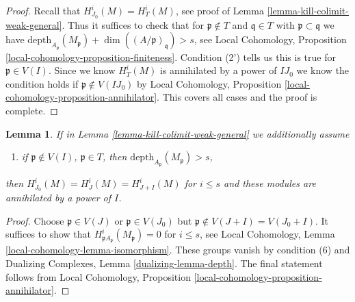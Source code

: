 \documentclass[10pt,a4paper]{amsart}
\theoremstyle{plain}
\newtheorem{lemma}[subsection]{Lemma}
\theoremstyle{definition}
\theoremstyle{remark}
\numberwithin{equation}{subsection}
\begin{document}
\begin{proof}
Recall that $H^i_{J_0}(M) = H^i_T(M)$, see proof of
Lemma \ref{lemma-kill-colimit-weak-general}. Thus it suffices to
check that for $\mathfrak p \not \in T$ and $\mathfrak q \in T$
with $\mathfrak p \subset \mathfrak q$ we have
$\text{depth}_{A_\mathfrak p}(M_\mathfrak p) +
\dim((A/\mathfrak p)_\mathfrak q) > s$, see Local Cohomology,
Proposition \ref{local-cohomology-proposition-finiteness}.
Condition (2') tells us this is true for $\mathfrak p \in V(I)$.
Since we know $H^i_T(M)$ is annihilated by a power of $IJ_0$
we know the condition holds if $\mathfrak p \not \in V(IJ_0)$
by Local Cohomology, Proposition \ref{local-cohomology-proposition-annihilator}.
This covers all cases and the proof is complete.
\end{proof}

\begin{lemma}
\label{lemma-kill-colimit-support-general}
If in Lemma \ref{lemma-kill-colimit-weak-general} we additionally assume
\begin{enumerate}
\item[(6)] if $\mathfrak p \not \in V(I)$, $\mathfrak p \in T$, then
$\text{depth}_{A_\mathfrak p}(M_\mathfrak p) > s$,
\end{enumerate}
then $H^i_{J_0}(M) = H^i_J(M) = H^i_{J + I}(M)$ for $i \leq s$ and these
modules are annihilated by a power of $I$.
\end{lemma}

\begin{proof}
Choose $\mathfrak p \in V(J)$ or $\mathfrak p \in V(J_0)$ but
$\mathfrak p \not \in V(J + I) = V(J_0 + I)$.
It suffices to show that $H^i_{\mathfrak pA_\mathfrak p}(M_\mathfrak p) = 0$
for $i \leq s$, see
Local Cohomology, Lemma \ref{local-cohomology-lemma-isomorphism}.
These groups vanish by condition (6) and
Dualizing Complexes, Lemma \ref{dualizing-lemma-depth}.
The final statement follows from
Local Cohomology, Proposition \ref{local-cohomology-proposition-annihilator}.
\end{proof}
\end{document}
